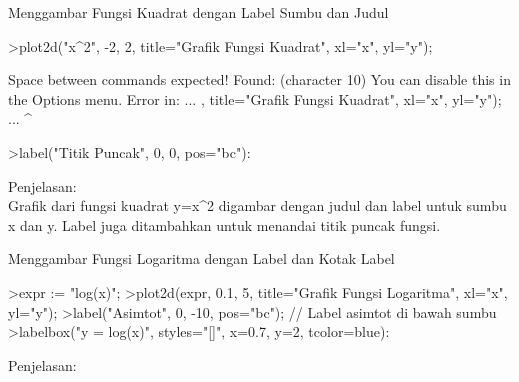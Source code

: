 \documentclass{article}
\begin{document}
\begin{eulernotebook}
\begin{eulercomment}
\begin{eulercomment}
\begin{eulercomment}
\begin{eulercomment}
\begin{eulercomment}
\begin{eulercomment}
\begin{eulercomment}
\begin{eulercomment}
\begin{eulercomment}
\begin{eulercomment}
\begin{eulercomment}
\begin{eulercomment}
\begin{eulercomment}
\begin{eulercomment}
\begin{eulercomment}
\end{eulercomment}
\eulersubheading{}
\begin{eulercomment}
\end{eulercomment}
\eulersubheading{}
\begin{eulercomment}
Menggambar Fungsi Kuadrat dengan Label Sumbu dan Judul\\
\end{eulercomment}
\eulersubheading{}
\begin{eulerprompt}
>plot2d("x^2", -2, 2, title="Grafik Fungsi Kuadrat", xl="x", yl="y");
\end{eulerprompt}
\begin{euleroutput}
  
  Space between commands expected!
  Found: 
   (character 10)
  You can disable this in the Options menu.
  Error in:
  ... , title="Grafik Fungsi Kuadrat", xl="x", yl="y");
   ...
                                                       ^
\end{euleroutput}
\begin{eulerprompt}
>label("Titik Puncak", 0, 0, pos="bc"):
\end{eulerprompt}
\begin{eulercomment}
Penjelasan:\\
Grafik dari fungsi kuadrat y=x\textasciicircum{}2 digambar dengan judul dan label untuk
sumbu x dan y. Label juga ditambahkan untuk menandai titik puncak
fungsi.

\end{eulercomment}
\eulersubheading{}
\begin{eulercomment}
Menggambar Fungsi Logaritma dengan Label dan Kotak Label\\
\end{eulercomment}
\eulersubheading{}
\begin{eulerprompt}
>expr := "log(x)";
>plot2d(expr, 0.1, 5, title="Grafik Fungsi Logaritma", xl="x", yl="y");
>label("Asimtot", 0, -10, pos="bc"); // Label asimtot di bawah sumbu
>labelbox("y = log(x)", styles="[]", x=0.7, y=2, tcolor=blue):
\end{eulerprompt}
\begin{eulercomment}
Penjelasan:


\end{eulercomment}
\end{eulercomment}
\end{eulercomment}
\end{eulercomment}
\end{eulercomment}
\end{eulercomment}
\end{eulercomment}
\end{eulercomment}
\end{eulercomment}
\end{eulercomment}
\end{eulercomment}
\end{eulercomment}
\end{eulercomment}
\end{eulercomment}
\end{eulercomment}
\end{eulernotebook}
\end{document}
